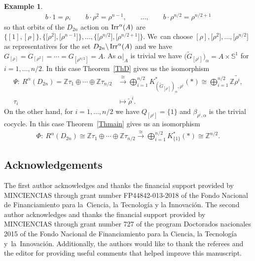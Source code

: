 \documentclass[10pt,a4paper]{amsart}
\def\Z{\mathbb{Z}}
\def\S{\mathbb{S}}
\DeclareMathOperator{\Irr}{\textup{Irr}}
\theoremstyle{definition}
\newtheorem{Ex}[Th]{Example}
\numberwithin{equation}{section}
\begin{document}
\begin{Ex}
\begin{gather*}
b\cdot 1=\rho,\qquad b\cdot \rho^{2}=\rho^{n-1},\qquad
\dots,\qquad b\cdot \rho^{n/2}=\rho^{n/2+1}
\end{gather*}
so that orbits of the $D_{2n}$ action on $\Irr^{\alpha}(A)$ are
$\big\{[1], [\rho]\big\}, \big\{\big[\rho^{2}\big], \big[\rho^{n-1}\big]\big\}, \dots, \big\{\big[\rho^{n/2}\big], \big[\rho^{n/2+1}\big]\big\}$.
We~can choose $[\rho], \big[\rho^{2}\big],\dots, \big[\rho^{n/2}\big]$ as representatives for the set
$D_{2n}\backslash \Irr^{\alpha}(A)$ and we have $G_{[\rho]}=G_{[\rho^{2}]}=\cdots =
G_{[\rho^{n/2}]}=A$. As $\alpha|_{A}$ is trivial we have
$\big(\widetilde{G}_{[\rho^{i}]}\big)_{\alpha}=A\times \S^{1}$ for $i=1, \dots, n/2$.
In this case Theorem~\ref{ThD} gives us the isomorphism
\begin{align*}
\Psi\colon\ R^{\alpha}(D_{2n})
=\Z\tau_{1}\oplus\cdots \oplus \Z\tau_{n/2}
&\stackrel{\cong}{\rightarrow}
\bigoplus_{i=1}^{n/2}K^{\ast}_{(\widetilde{G}_{[\rho^{i}]})_{\alpha},\rho^{i}}(\ast)
\cong \bigoplus_{i=1}^{n/2}
 \Z\tilde{\rho^{i}},
 \\
\tau_{i}&\mapsto \tilde{\rho}^{i}.
\end{align*}
On the other hand, for $i=1, \dots, n/2$ we have $Q_{[\rho^{i}]}=\{1\}$ and
$\beta_{\rho^{i},\alpha}$ is the trivial cocycle. In this case
Theorem~\ref{Thmain} gives us an isomorphism
\begin{gather*}
\Phi\colon\ R^{\alpha}(D_{2n})\cong \Z\tau_{1}\oplus\cdots \oplus \Z\tau_{n/2}
\stackrel{\cong}{\rightarrow} \bigoplus_{i=1}^{n/2}K^{\ast}_{\{1\}}(\ast)\cong \Z^{n/2}.
\end{gather*}
\end{Ex}


\subsection*{Acknowledgements}

The first author acknowledges and thanks the financial support provided by
MINCIENCIAS through grant number FP44842-013-2018 of the
Fondo Nacional de Financiamiento para la~Ciencia, la Tecnolog\'ia y la Innovaci\'on.
The second author acknowledges and thanks the financial support provided by MINCIENCIAS
through grant number 727 of the program Doctorados nacio\-nales 2015 of the Fondo Nacional de
Financiamiento para la Ciencia, la Tecnolog\'ia y~la~Inno\-vaci\'on. Additionally, the authors would
like to thank the referees and the editor for providing useful comments that helped improve this manuscript.
\end{document}
